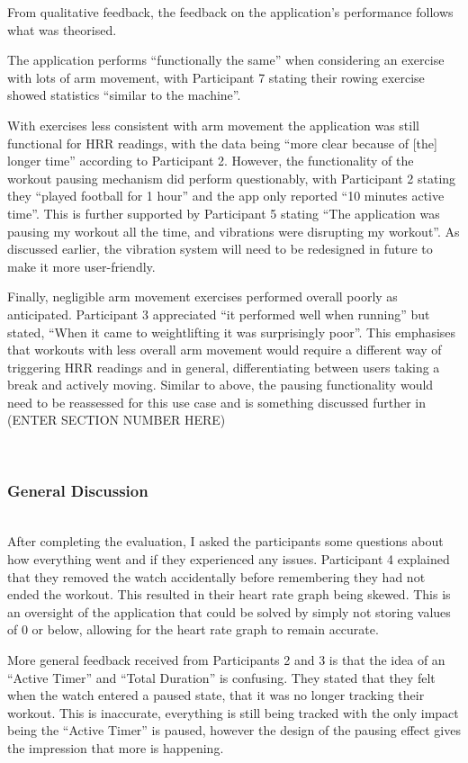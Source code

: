 \documentclass{l4proj}
\begin{document}
From qualitative feedback, the feedback on the application’s performance follows what was theorised. 

The application performs “functionally the same” when considering an exercise with lots of arm movement, with Participant 7 stating their rowing exercise showed statistics “similar to the machine”. 

With exercises less consistent with arm movement the application was still functional for HRR readings, with the data being “more clear because of [the] longer time” according to Participant 2. However, the functionality of the workout pausing mechanism did perform questionably, with Participant 2 stating they “played football for 1 hour” and the app only reported “10 minutes active time”. This is further supported by Participant 5 stating “The application was pausing my workout all the time, and vibrations were disrupting my workout”. As discussed earlier, the vibration system will need to be redesigned in future to make it more user-friendly.

Finally, negligible arm movement exercises performed overall poorly as anticipated. Participant 3 appreciated “it performed well when running” but stated, “When it came to weightlifting it was surprisingly poor”. This emphasises that workouts with less overall arm movement would require a different way of triggering HRR readings and in general, differentiating between users taking a break and actively moving. Similar to above, the pausing functionality would need to be reassessed for this use case and is something discussed further in (ENTER SECTION NUMBER HERE)

\noindent\mbox{}\\
\subsubsection{General Discussion}
\noindent\mbox{}\\

After completing the evaluation, I asked the participants some questions about how everything went and if they experienced any issues. Participant 4 explained that they removed the watch accidentally before remembering they had not ended the workout. This resulted in their heart rate graph being skewed. This is an oversight of the application that could be solved by simply not storing values of 0 or below, allowing for the heart rate graph to remain accurate.

More general feedback received from Participants 2 and 3 is that the idea of an “Active Timer” and “Total Duration” is confusing. They stated that they felt when the watch entered a paused state, that it was no longer tracking their workout. This is inaccurate, everything is still being tracked with the only impact being the “Active Timer” is paused, however the design of the pausing effect gives the impression that more is happening.
\end{document}
